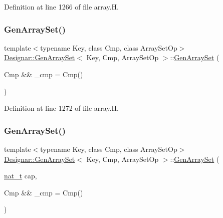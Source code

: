 Definition at line 1266 of file array.\+H.

\mbox{\label{class_designar_1_1_gen_array_set_a6dd76e1d1ccb49b3e984c18b05c98dd2}} 
\subsubsection{\texorpdfstring{Gen\+Array\+Set()}{GenArraySet()}\hspace{0.1cm}{\footnotesize\ttfamily [2/6]}}
{\footnotesize\ttfamily template$<$typename Key, class Cmp, class Array\+Set\+Op$>$ \\
\hyperlink{class_designar_1_1_gen_array_set}{Designar\+::\+Gen\+Array\+Set}$<$ Key, Cmp, Array\+Set\+Op $>$\+::\hyperlink{class_designar_1_1_gen_array_set}{Gen\+Array\+Set} (\begin{DoxyParamCaption}\item[{Cmp \&\&}]{\+\_\+cmp = {\ttfamily Cmp()} }\end{DoxyParamCaption})\hspace{0.3cm}{\ttfamily [inline]}}



Definition at line 1272 of file array.\+H.

\mbox{\label{class_designar_1_1_gen_array_set_ab2ffd26edcd909f936394e538b43d2c4}} 
\subsubsection{\texorpdfstring{Gen\+Array\+Set()}{GenArraySet()}\hspace{0.1cm}{\footnotesize\ttfamily [3/6]}}
{\footnotesize\ttfamily template$<$typename Key, class Cmp, class Array\+Set\+Op$>$ \\
\hyperlink{class_designar_1_1_gen_array_set}{Designar\+::\+Gen\+Array\+Set}$<$ Key, Cmp, Array\+Set\+Op $>$\+::\hyperlink{class_designar_1_1_gen_array_set}{Gen\+Array\+Set} (\begin{DoxyParamCaption}\item[{\hyperlink{namespace_designar_aa72662848b9f4815e7bf31a7cf3e33d1}{nat\+\_\+t}}]{cap,  }\item[{Cmp \&\&}]{\+\_\+cmp = {\ttfamily Cmp()} }\end{DoxyParamCaption})\hspace{0.3cm}{\ttfamily [inline]}}



